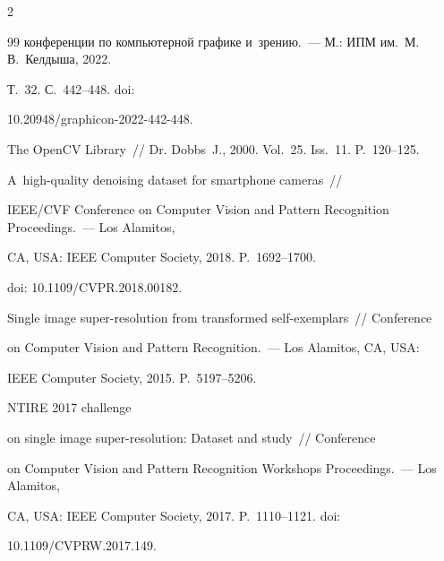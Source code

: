 \begin{multicols}{2}
{{\begin{thebibliography}{99}
конференции по  компьютерной графике и~зрению.~---    М.: ИПМ им.\ М.\,В.~Келдыша, 2022.


 Т.~32. С.~442--448. doi: 


10.20948/graphicon-2022-442-448.


   




     The OpenCV Library~// Dr. Dobbs~J., 2000. Vol.~25. Iss.~11. P.~120--125.


    




     A~high-quality denoising dataset for smartphone cameras~// 


    IEEE/CVF Conference on Computer Vision and Pattern Recognition Proceedings.~--- Los Alamitos, 


CA, USA: IEEE Computer Society, 2018. P.~1692--1700.


    doi: 10.1109/CVPR.2018.00182.


    






Single     image super-resolution from transformed self-exemplars~// Conference 


on Computer Vision and Pattern Recognition.~--- Los Alamitos, CA, USA: 


IEEE Computer Society, 2015. P.~5197--5206.


    




     NTIRE 2017 challenge 


on single    image super-resolution: Dataset and study~//  Conference 


on Computer Vision and Pattern Recognition Workshops Proceedings.~--- Los Alamitos, 


CA, USA: IEEE Computer Society, 2017. P.~1110--1121. doi: 


10.1109/CVPRW.2017.149.


    







\end{thebibliography}}}
\end{multicols}
